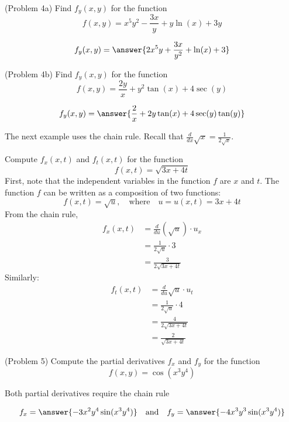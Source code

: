 \documentclass[handout]{ximera}
\begin{document}
\begin{problem}(Problem 4a)
Find $f_y(x,y)$ for the function 
\[
f(x,y) = x^5y^2 - \frac{3x}{y} + y\ln(x) + 3y
\]

\[
f_y(x,y) = \answer{2x^5 y + \frac{3x}{y^2} + \ln(x) + 3}
\]
\end{problem}

\begin{problem}(Problem 4b)
Find $f_y(x,y)$ for the function 
\[
f(x,y) = \frac{2y}{x} + y^2\tan(x) + 4\sec(y)
\]

\[
f_y(x,y) = \answer{\frac{2}{x} + 2y\tan(x) + 4\sec(y)\tan(y)}
\]
\end{problem}

The next example uses the chain rule.  Recall that $\frac{d}{dx} \sqrt x = \frac{1}{2\sqrt x}$.

\begin{example}[Example 5]
Compute $f_x(x,t)$ and $f_t(x,t)$ for the function 
\[
f(x,t) = \sqrt{3x + 4t}
\]
First, note that the independent variables in the function $f$ are $x$ and $t$.
The function $f$ can be written as a composition of two functions:
\[
f(x,t) = \sqrt {u}, \quad \text{where} \quad u= u(x,t) = 3x + 4t
\]
From the chain rule,
\begin{align*}
f_x(x,t) &= \frac{d}{du}\left( \sqrt u\right) \cdot u_x\\
  & = \frac{1}{2\sqrt u} \cdot 3\\
  &= \frac{3}{2\sqrt{3x + 4t}}
\end{align*}
Similarly:
\begin{align*}
f_t(x,t) &= \frac{d}{du} \sqrt u \cdot u_t\\
  & = \frac{1}{2\sqrt u} \cdot 4\\
  &= \frac{4}{2\sqrt{3x + 4t}}\\
 &= \frac{2}{\sqrt{3x + 4t}}
\end{align*}
  
\end{example}

\begin{problem}(Problem 5)
Compute the partial derivatives $f_x$ and $f_y$ for the function
\[
f(x,y) = \cos(x^3y^4)
\]
\begin{hint}
Both partial derivatives require the chain rule
\end{hint}

\[
f_x = \answer{-3x^2y^4 \sin(x^3y^4)} \quad \text{and} \quad f_y = \answer{-4x^3y^3 \sin(x^3y^4)}
\]
\end{problem}
\end{document}
